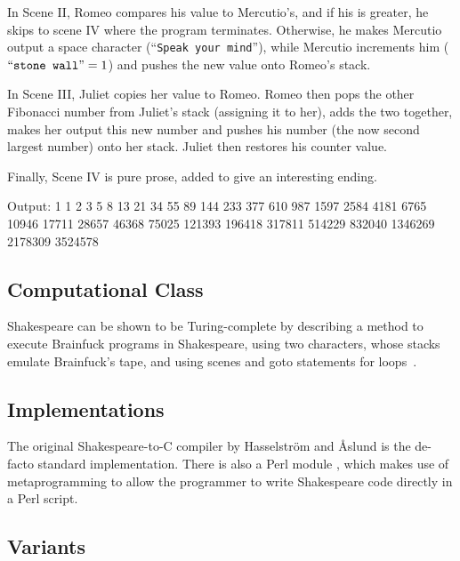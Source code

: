 In Scene II, Romeo compares his value to Mercutio's, and if his is greater, he skips to scene IV where the program terminates. Otherwise, he makes Mercutio output a space character (“\texttt{Speak your mind}”), while Mercutio increments him ($\text{“\texttt{stone wall}”} = 1$) and pushes the new value onto Romeo's stack.



In Scene III, Juliet copies her value to Romeo. Romeo then pops the other Fibonacci number from Juliet's stack (assigning it to her), adds the two together, makes her output this new number and pushes his number (the now second largest number) onto her stack. Juliet then restores his counter value.



Finally, Scene IV is pure prose, added to give an interesting ending.



\begin{io}
Output:
1 1 2 3 5 8 13 21 34 55 89 144 233 377 610 987 1597 2584
4181 6765 10946 17711 28657 46368 75025 121393 196418
317811 514229 832040 1346269 2178309 3524578
\end{io}

\subsection{Computational Class}

Shakespeare can be shown to be Turing-complete by describing a method to execute Brainfuck programs in Shakespeare, using two characters, whose stacks emulate Brainfuck's tape, and using scenes and goto statements for loops~\cite{stux2005shakespeare}.

\subsection{Implementations}

The original Shakespeare-to-C compiler \cite{hasselstrom_shakespeare} by Hasselström and Åslund is the de-facto standard implementation. There is also a Perl module \cite{barr_lingua}, which makes use of metaprogramming to allow the programmer to write Shakespeare code directly in a Perl script.

\subsection{Variants}

